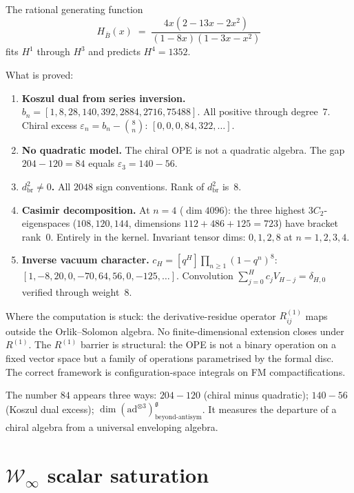\documentclass[11pt]{article}
\newcommand{\cW}{\mathcal{W}}
\newcommand{\fg}{\mathfrak{g}}
\newcommand{\B}{\bar{B}}
\begin{document}
The rational generating function
\[
  H_{\B}(x) \;=\; \frac{4x(2 - 13x - 2x^2)}{(1-8x)(1-3x-x^2)}
\]
fits $H^1$ through $H^3$ and predicts $H^4 = 1352$.

What is proved:
\begin{enumerate}[label=(\roman*),nosep]
\item \textbf{Koszul dual from series inversion.}
$b_n = [1,8,28,140,392,2884,2716,75488]$.  All positive through
degree~$7$.  Chiral excess
$\varepsilon_n = b_n - \binom{8}{n}$: $[0,0,0,84,322,\ldots]$.

\item \textbf{No quadratic model.}
The chiral OPE is not a quadratic algebra.  The gap
$204 - 120 = 84$ equals $\varepsilon_3 = 140 - 56$.

\item \textbf{$d_{\mathrm{br}}^2 \neq 0$.}
All $2048$ sign conventions.  Rank of $d_{\mathrm{br}}^2$ is~$8$.

\item \textbf{Casimir decomposition.}
At $n = 4$ ($\dim 4096$): the three highest $3C_2$-eigenspaces
($108, 120, 144$, dimensions $112 + 486 + 125 = 723$) have
bracket rank~$0$.  Entirely in the kernel.
Invariant tensor dims: $0, 1, 2, 8$ at $n = 1,2,3,4$.

\item \textbf{Inverse vacuum character.}
$c_H = [q^H]\prod_{n \geq 1}(1-q^n)^8$:
$[1,-8,20,0,-70,64,56,0,-125,\ldots]$.
Convolution $\sum_{j=0}^H c_j V_{H-j} = \delta_{H,0}$
verified through weight~$8$.
\end{enumerate}

Where the computation is stuck: the derivative-residue operator
$R^{(1)}_{ij}$ maps outside the Orlik--Solomon algebra.
No finite-dimensional extension closes under $R^{(1)}$.  The
$R^{(1)}$ barrier is structural: the OPE is not a binary operation
on a fixed vector space but a family of operations parametrised by
the formal disc.  The correct framework is configuration-space
integrals on FM compactifications.

The number $84$ appears three ways:
$204 - 120$ (chiral minus quadratic);
$140 - 56$ (Koszul dual excess);
$\dim(\mathrm{ad}^{\otimes 3})^\fg_{\text{beyond-antisym}}$.
It measures the departure of a chiral algebra from a universal
enveloping algebra.


\section{$\cW_\infty$ scalar saturation}
\label{sec:winfty}
\end{document}
